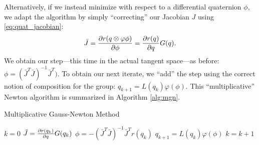 \documentclass[letterpaper, 10 pt, conference]{ieeeconf}  %
\begin{document}
    Alternatively, if we instead minimize with respect to a differential quaternion $\phi$,
    we adapt the algorithm by simply ``correcting'' our Jacobian $J$ using 
    \eqref{eq:quat_jacobian}:
    \begin{equation} 
        \bar{J} = \pdv{r(q \otimes \varphi{\phi})}{\phi} = \pdv{r(q)}{q} G(q).
    \end{equation}
    We obtain our step---this time in the actual tangent space---as before:
    $\phi = (\bar{J}^T \bar{J})^{-1} \bar{J}^T)$. To obtain our next iterate, we ``add'' the
    step using the correct notion of composition for the group: 
    $q_{k+1} = L(q_k) \varphi(\phi)$. This ``multiplicative'' Newton algorithm is 
    summarized in Algorithm \ref{alg:mgn}.

    \begin{algorithm} 
    	\begin{algorithmic}[1]
    		\caption{Multiplicative Gauss-Newton Method}\label{alg:mgn}
    		\State $k = 0$
    		    \State $\bar{J} = \pdv{r(q_k)}{q} G(q_k)$ 
    		    \State $ \phi = -(\bar{J}^T \bar{J})^{-1} \bar{J}^T r(q_k)$ 
    		    \State $q_{k+1} = L(q_k) \varphi(\phi)$ 
    		    \State $k = k + 1$
    		\EndWhile
    	\end{algorithmic}
    \end{algorithm}
\end{document}
